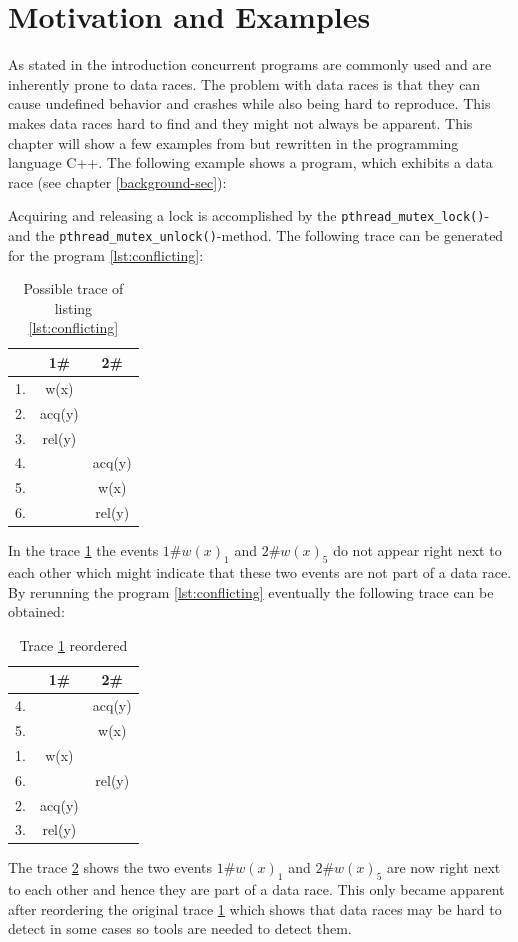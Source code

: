 \documentclass[12pt]{article}
\begin{document}
	\section{Motivation and Examples}
	As stated in the introduction concurrent programs are commonly used and are inherently prone to data races. The problem with data races is that they can cause undefined behavior and crashes while also being hard to reproduce. This makes data races hard to find and they might not always be apparent. This chapter will show a few examples from \cite{sulzmann2} but rewritten in the programming language C++. The following example shows a program, which exhibits a data race (see chapter \ref{background-sec}):
	
	Acquiring and releasing a lock is accomplished by the \texttt{pthread\_mutex\_lock()}- and the \texttt{pthread\_mutex\_unlock()}-method. The following trace can be generated for the program \ref{lst:conflicting}:
	\begin{table}[H]
		\begin{center}
			\begin{tabular}{ c c c}
				& 1\# & 2\# \\
				\hline
				1. & w(x) & \\
				2. & acq(y) & \\
				3. & rel(y) & \\
				4. & & acq(y) \\
				5. & & w(x) \\
				6. & & rel(y) \\
			\end{tabular}
			\caption{Possible trace of listing \ref{lst:conflicting}}
			\label{trace1}
		\end{center}
	\end{table}
	In the trace \ref{trace1} the events $1\#w(x)_1$ and $2\#w(x)_5$ do not appear right next to each other which might indicate that these two events are not part of a data race. By rerunning the program \ref{lst:conflicting} eventually the following trace can be obtained:
	\begin{table}[H]
		\begin{center}
			\begin{tabular}{ c c c}
				& 1\# & 2\# \\
				\hline
				4. & & acq(y) \\
				5. & & w(x) \\
				1. & w(x) & \\
				6. &  & rel(y) \\
				2. & acq(y) & \\
				3. & rel(y) & \\
			\end{tabular}
			\caption{Trace \ref{trace1} reordered}
			\label{trace2}
		\end{center}
	\end{table}
	The trace \ref{trace2} shows the two events $1\#w(x)_1$ and $2\#w(x)_5$ are now right next to each other and hence they are part of a data race. This only became apparent after reordering the original trace \ref{trace1} which shows that data races may be hard to detect in some cases so tools are needed to detect them.
\end{document}
